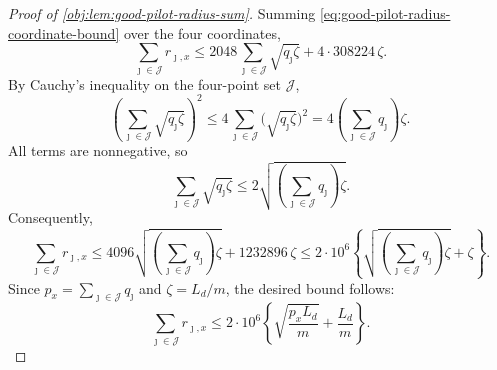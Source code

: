 \begin{proof}[Proof of \cref{obj:lem:good-pilot-radius-sum}]
Summing \cref{eq:good-pilot-radius-coordinate-bound} over the four coordinates,
\[
\sum_{\jmath\in\mathcal J}r_{\jmath,x}
\le
2048\sum_{\jmath\in\mathcal J}\sqrt{q_\jmath\zeta}
+
4\cdot 308224\,\zeta .
\]
By Cauchy's inequality on the four-point set \(\mathcal J\),
\[
\left(\sum_{\jmath\in\mathcal J}\sqrt{q_\jmath\zeta}\right)^2
\le
4\sum_{\jmath\in\mathcal J}\bigl(\sqrt{q_\jmath\zeta}\bigr)^2
=
4\left(\sum_{\jmath\in\mathcal J}q_\jmath\right)\zeta .
\]
All terms are nonnegative, so
\[
\sum_{\jmath\in\mathcal J}\sqrt{q_\jmath\zeta}
\le
2\sqrt{\left(\sum_{\jmath\in\mathcal J}q_\jmath\right)\zeta}.
\]
Consequently,
\[
\sum_{\jmath\in\mathcal J}r_{\jmath,x}
\le
4096\sqrt{\left(\sum_{\jmath\in\mathcal J}q_\jmath\right)\zeta}
+
1232896\,\zeta
\le
2\cdot 10^6
\left\{
\sqrt{\left(\sum_{\jmath\in\mathcal J}q_\jmath\right)\zeta}
+\zeta
\right\}.
\]
Since \(p_x=\sum_{\jmath\in\mathcal J}q_\jmath\) and \(\zeta=L_d/m\), the desired bound follows:
\[
\sum_{\jmath\in\mathcal J} r_{\jmath,x}
\le
2\cdot 10^6
\left\{
\sqrt{\frac{p_xL_d}{m}}+\frac{L_d}{m}
\right\}.
\]
\end{proof}

